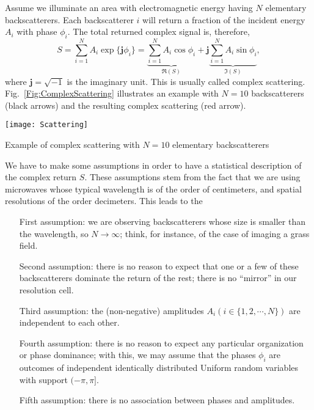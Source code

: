 Assume we illuminate an area with electromagnetic energy having $N$ elementary backscatterers.
Each backscatterer $i$ will return a fraction of the incident energy $A_i$ with phase $\phi_i$.
The total returned complex signal is, therefore,
\begin{equation}
S = \sum_{i=1}^{N} A_i \exp\{\mathbf j \phi_i\} = 
\underbrace{{\sum_{i=1}^{N} A_i \cos \phi_i}}_{\Re(S)} +\mathbf j \underbrace{ \sum_{i=1}^{N} A_i \sin \phi_i}_{\Im(S)}, 
\label{Eq:ComplexBackscatter}
\end{equation}
where $\mathbf j=\sqrt{-1}$ is the imaginary unit.
This is usually called complex scattering.
Fig.~\ref{Fig:ComplexScattering} illustrates an example with $N=10$ backscatterers (black arrows) and the resulting complex scattering (red arrow).

\begin{marginfigure}
\texttt{[image: Scattering]}
\caption{Example of complex scattering with $N=10$ elementary backscatterers}\label{Fig:ComplexScattering}
\end{marginfigure}

We have to make some assumptions in order to have a statistical description of the complex return $S$.
These assumptions stem from the fact that we are using microwaves whose typical wavelength is of the order of centimeters, and spatial resolutions of the order decimeters.
This leads to the 
\begin{itemize}
\item[First assumption:] we are observing backscatterers whose size is smaller than the wavelength, so $N\to\infty$; think, for instance, of the case of imaging a grass field.
\item[Second assumption:] there is no reason to expect that one or a few of these backscatterers dominate the return of the rest; there is no ``mirror'' in our resolution cell.
\item[Third assumption:] the (non-negative) amplitudes $A_i(i\in\{1,2,\cdots,N\})$ are independent to each other.
\item[Fourth assumption:] there is no reason to expect any particular organization or phase dominance; with this, we may assume that the phases $\phi_i$ are outcomes of independent identically distributed Uniform random variables with support $(-\pi,\pi]$.
\item[Fifth assumption:] there is no association between phases and amplitudes.
\end{itemize}
 

